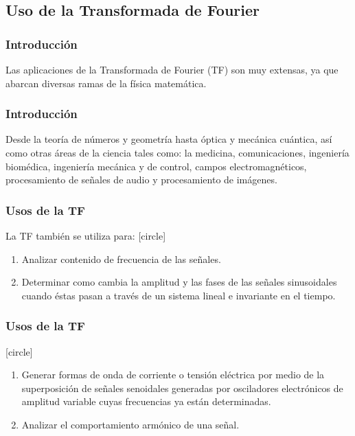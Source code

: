 \subsection{Uso de la Transformada de Fourier}
\begin{frame}
\frametitle{Introducción}
Las aplicaciones de la Transformada de Fourier (TF) son muy extensas, ya que abarcan diversas ramas de la física matemática.
\end{frame}
\begin{frame}
\frametitle{Introducción}
Desde la teoría de números y geometría hasta óptica y mecánica cuántica, así como otras áreas de la ciencia tales como: la medicina, comunicaciones, ingeniería biomédica, ingeniería mecánica y de control, campos electromagnéticos, procesamiento de señales de audio y procesamiento de imágenes.
\end{frame}
\begin{frame}
\frametitle{Usos de la TF}
La TF también se utiliza para:
[circle]
\begin{enumerate}[<+->]
\item Analizar contenido de frecuencia de las señales.
\item Determinar como cambia la amplitud y las fases de las señales sinusoidales cuando éstas pasan a través de un sistema lineal e invariante en el tiempo.
\seti
\end{enumerate}
\end{frame}
\begin{frame}
\frametitle{Usos de la TF}
[circle]
\begin{enumerate}[<+->]
\conti
\item Generar formas de onda de corriente o tensión eléctrica por medio de la superposición de señales senoidales generadas por osciladores electrónicos de amplitud variable cuyas frecuencias ya están determinadas.
\item Analizar el comportamiento armónico de una señal.
\end{enumerate}
\end{frame}
